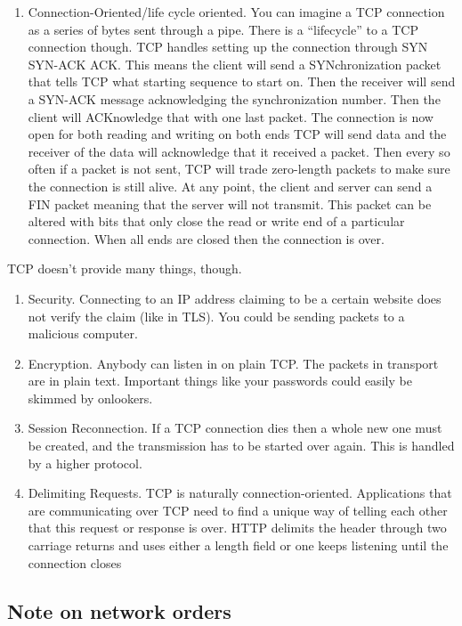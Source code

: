 \begin{enumerate}
\item Connection-Oriented/life cycle oriented.
  You can imagine a TCP connection as a series of bytes sent through a pipe.
  There is a ``lifecycle'' to a TCP connection though.
  TCP handles setting up the connection through SYN SYN-ACK ACK. This means the client will send a SYNchronization packet that tells TCP what starting sequence to start on. Then the receiver will send a SYN-ACK message acknowledging the synchronization number.
  Then the client will ACKnowledge that with one last packet.
  The connection is now open for both reading and writing on both ends
  TCP will send data and the receiver of the data will acknowledge that it received a packet.
  Then every so often if a packet is not sent, TCP will trade zero-length packets to make sure the connection is still alive.
  At any point, the client and server can send a FIN packet meaning that the server will not transmit.
  This packet can be altered with bits that only close the read or write end of a particular connection. When all ends are closed then the connection is over.
\end{enumerate}

TCP doesn't provide many things, though.

\begin{enumerate}
\item Security.
  Connecting to an IP address claiming to be a certain website does not verify the claim (like in TLS).
  You could be sending packets to a malicious computer.
\item Encryption.
  Anybody can listen in on plain TCP.
  The packets in transport are in plain text.
  Important things like your passwords could easily be skimmed by onlookers.
\item Session Reconnection. If a TCP connection dies then a whole new one must be created, and the transmission has to be started over again.
  This is handled by a higher protocol.
\item Delimiting Requests.
  TCP is naturally connection-oriented.
  Applications that are communicating over TCP need to find a unique way of telling each other that this request or response is over.
  HTTP delimits the header through two carriage returns and uses either a length field or one keeps listening until the connection closes
\end{enumerate}

\subsection{Note on network orders}

